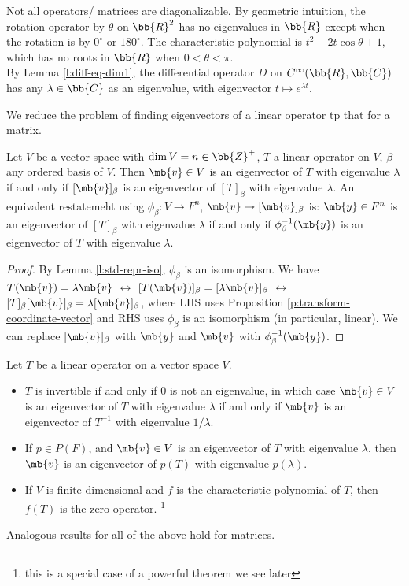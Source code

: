 \begin{example}
Not all operators/ matrices are diagonalizable. By geometric intuition, the rotation operator by $\theta$ on $\bb{R}^2$ has no eigenvalues in $\bb{R}$ except when the rotation is by $0^\circ$ or $180^\circ$.
The characteristic polynomial is $t^2-2t \cos \theta +1$, which has no roots in $\bb{R}$ when $0< \theta < \pi$.\\
By Lemma \ref{l:diff-eq-dim1}, the differential operator $D$ on $C^\infty (\bb{R}, \bb{C})$ has any $\lambda \in \bb{C}$ as an eigenvalue, with eigenvector $t \mapsto e^{\lambda t}$.
\end{example}
We reduce the problem of finding eigenvectors of a linear operator tp that for a matrix.
\begin{exer}
Let $V$ be a vector space with $\dim V=n \in \bb{Z}^+$, $T$ a linear operator on $V$, $\beta$ any ordered basis of $V$.
Then $\mb{v}\in V$ is an eigenvector of $T$ with eigenvalue $\lambda$ if and only if $[ \mb{v}]_\beta$ is an eigenvector of $[T]_\beta$ with eigenvalue $\lambda$.
An equivalent restatemeht using $\phi_\beta:V \to F^n$, $\mb{v}\mapsto [ \mb{v}]_\beta$ is: $\mb{y}\in F^n$ is an eigenvector of $[T]_\beta$ with eigenvalue $\lambda$ if and only if $\phi_\beta^{-1}( \mb{y})$ is an eigenvector of $T$ with eigenvalue $\lambda$.
\end{exer}
\begin{proof}%
By Lemma \ref{l:std-repr-iso}, $\phi_\beta$ is an isomorphism. We have $T( \mb{v})= \lambda \mb{v}$ $\leftrightarrow$ $[T( \mb{v})]_\beta =[ \lambda \mb{v}]_\beta$ $\leftrightarrow$ $[T]_\beta [ \mb{v}]_\beta = \lambda[ \mb{v}]_\beta$, where LHS uses Proposition \ref{p:transform-coordinate-vector} and RHS uses $\phi_\beta$ is an isomorphism (in particular, linear).
We can replace $[ \mb{v}]_\beta$ with $\mb{y}$ and $\mb{v}$ with $\phi_\beta^{-1}( \mb{y})$.
\end{proof}
\begin{exer}\label{e:eig-poly}
Let $T$ be a linear operator on a vector space $V$.
\begin{itemize}
\item $T$ is invertible if and only if 0 is not an eigenvalue, in which case $\mb{v}\in V$ is an eigenvector of $T$ with eigenvalue $\lambda$ if and only if $\mb{v}$ is an eigenvector of $T^{-1}$ with eigenvalue $1/ \lambda$.
\item If $p \in P(F)$, and $\mb{v}\in V$ is an eigenvector of $T$ with eigenvalue $\lambda$, then $\mb{v}$ is an eigenvector of $p(T)$ with eigenvalue $p( \lambda)$.
\item If $V$ is finite dimensional and $f$ is the characteristic polynomial of $T$, then $f(T)$ is the zero operator. \footnote{this is a special case of a powerful theorem we see later}
\end{itemize}
Analogous results for all of the above hold for matrices.
\end{exer}
